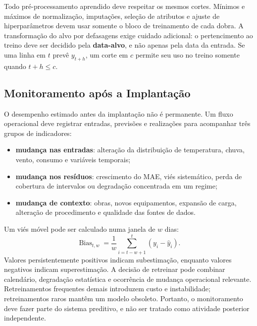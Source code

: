 Todo pré-processamento aprendido deve respeitar os mesmos cortes. Mínimos e máximos de normalização, imputações, seleção de atributos e ajuste de hiperparâmetros devem usar somente o bloco de treinamento de cada dobra. A transformação do alvo por defasagens exige cuidado adicional: o pertencimento ao treino deve ser decidido pela \textbf{data-alvo}, e não apenas pela data da entrada. Se uma linha em $t$ prevê $y_{t+h}$, um corte em $c$ permite seu uso no treino somente quando $t+h\leq c$.

\subsection{Monitoramento após a Implantação}

O desempenho estimado antes da implantação não é permanente. Um fluxo operacional deve registrar entradas, previsões e realizações para acompanhar três grupos de indicadores:
\begin{itemize}
    \item \textbf{mudança nas entradas}: alteração da distribuição de temperatura, chuva, vento, consumo e variáveis temporais;
    \item \textbf{mudança nos resíduos}: crescimento do MAE, viés sistemático, perda de cobertura de intervalos ou degradação concentrada em um regime;
    \item \textbf{mudança de contexto}: obras, novos equipamentos, expansão de carga, alteração de procedimento e qualidade das fontes de dados.
\end{itemize}

Um viés móvel pode ser calculado numa janela de $w$ dias:
\begin{equation}
    \operatorname{Bias}_{t,w}
    =\frac{1}{w}\sum_{i=t-w+1}^{t}(y_i-\hat{y}_i).
    \label{eq:bias_movel}
\end{equation}
Valores persistentemente positivos indicam subestimação, enquanto valores negativos indicam superestimação. A decisão de retreinar pode combinar calendário, degradação estatística e ocorrência de mudança operacional relevante. Retreinamentos frequentes demais introduzem custo e instabilidade; retreinamentos raros mantêm um modelo obsoleto. Portanto, o monitoramento deve fazer parte do sistema preditivo, e não ser tratado como atividade posterior independente.


